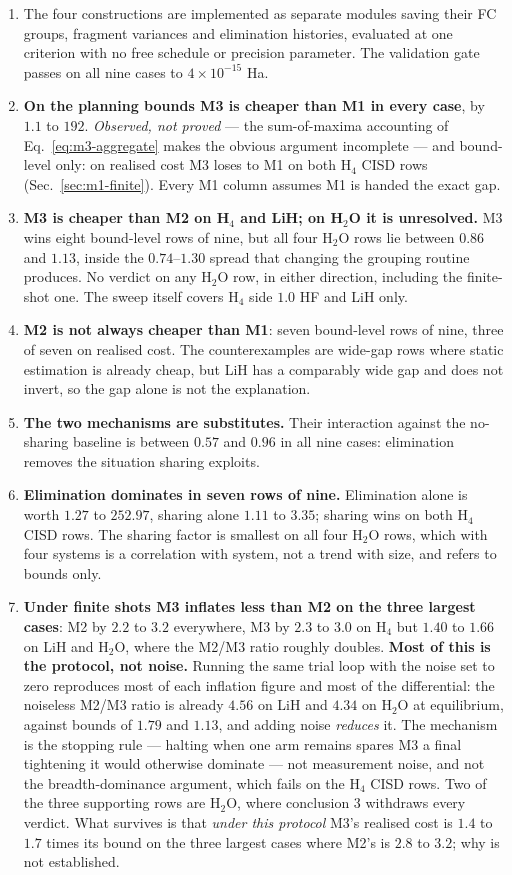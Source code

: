 \documentclass[10pt]{article}
\begin{document}
\begin{enumerate}[leftmargin=2em]
  \item The four constructions are implemented as separate modules saving their FC groups, fragment variances and elimination histories, evaluated at one criterion with no free schedule or precision parameter. The validation gate passes on all nine cases to $4\times10^{-15}$ Ha.
  \item \textbf{On the planning bounds M3 is cheaper than M1 in every case}, by $1.1$ to $192$. \emph{Observed, not proved} --- the sum-of-maxima accounting of Eq.~\eqref{eq:m3-aggregate} makes the obvious argument incomplete --- and bound-level only: on realised cost M3 loses to M1 on both H$_4$ CISD rows (Sec.~\ref{sec:m1-finite}). Every M1 column assumes M1 is handed the exact gap.
  \item \textbf{M3 is cheaper than M2 on H$_4$ and LiH; on H$_2$O it is unresolved.} M3 wins eight bound-level rows of nine, but all four H$_2$O rows lie between $0.86$ and $1.13$, inside the $0.74$--$1.30$ spread that changing the grouping routine produces. No verdict on any H$_2$O row, in either direction, including the finite-shot one. The sweep itself covers H$_4$ side $1.0$ HF and LiH only.
  \item \textbf{M2 is not always cheaper than M1}: seven bound-level rows of nine, three of seven on realised cost. The counterexamples are wide-gap rows where static estimation is already cheap, but LiH has a comparably wide gap and does not invert, so the gap alone is not the explanation.
  \item \textbf{The two mechanisms are substitutes.} Their interaction against the no-sharing baseline is between $0.57$ and $0.96$ in all nine cases: elimination removes the situation sharing exploits.
  \item \textbf{Elimination dominates in seven rows of nine.} Elimination alone is worth $1.27$ to $252.97$, sharing alone $1.11$ to $3.35$; sharing wins on both H$_4$ CISD rows. The sharing factor is smallest on all four H$_2$O rows, which with four systems is a correlation with system, not a trend with size, and refers to bounds only.
  \item \textbf{Under finite shots M3 inflates less than M2 on the three largest cases}: M2 by $2.2$ to $3.2$ everywhere, M3 by $2.3$ to $3.0$ on H$_4$ but $1.40$ to $1.66$ on LiH and H$_2$O, where the M2/M3 ratio roughly doubles. \textbf{Most of this is the protocol, not noise.} Running the same trial loop with the noise set to zero reproduces most of each inflation figure and most of the differential: the noiseless M2/M3 ratio is already $4.56$ on LiH and $4.34$ on H$_2$O at equilibrium, against bounds of $1.79$ and $1.13$, and adding noise \emph{reduces} it. The mechanism is the stopping rule --- halting when one arm remains spares M3 a final tightening it would otherwise dominate --- not measurement noise, and not the breadth-dominance argument, which fails on the H$_4$ CISD rows. Two of the three supporting rows are H$_2$O, where conclusion 3 withdraws every verdict. What survives is that \emph{under this protocol} M3's realised cost is $1.4$ to $1.7$ times its bound on the three largest cases where M2's is $2.8$ to $3.2$; why is not established.

\end{enumerate}
\end{document}
